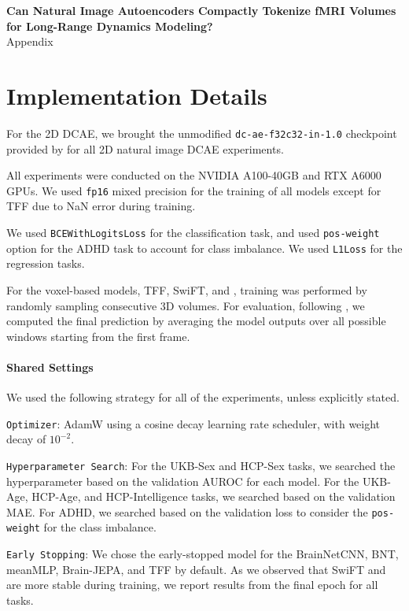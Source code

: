 \onecolumn
\clearpage
\renewcommand{\thetable}{A\arabic{table}}
\renewcommand\thesection{\Alph{section}}
\setcounter{section}{0}
{
\centering
\Large
\textbf{Can Natural Image Autoencoders Compactly Tokenize fMRI Volumes \\for Long-Range Dynamics Modeling?}\\
\vspace{0.5em}Appendix\\
\vspace{1.0em}
}

\section{Implementation Details}
\label{sec:experimental_details}
For the 2D DCAE, we brought the unmodified \texttt{dc-ae-f32c32-in-1.0} checkpoint provided by \citet{DCAE} for all 2D natural image DCAE experiments.

All experiments were conducted on the NVIDIA A100-40GB and RTX A6000 GPUs. We used \texttt{fp16} mixed precision for the training of all models except for TFF due to NaN error during training.

We used \texttt{BCEWithLogitsLoss} for the classification task, and used \texttt{pos-weight} option for the ADHD task to account for class imbalance.
We used \texttt{L1Loss} for the regression tasks.

For the voxel-based models, TFF, SwiFT, and {\ours}, training was performed by randomly sampling consecutive 3D volumes. For evaluation, following \citet{swift}, we computed the final prediction by averaging the model outputs over all possible windows starting from the first frame.

\paragraph{Shared Settings}
We used the following strategy for all of the experiments, unless explicitly stated.
\begin{compactitem}
\item \texttt{Optimizer}: AdamW using a cosine decay learning rate scheduler, with weight decay of $10^{-2}$.

\item \texttt{Hyperparameter Search}: For the UKB-Sex and HCP-Sex tasks, we searched the hyperparameter based on the validation AUROC for each model.
For the UKB-Age, HCP-Age, and HCP-Intelligence tasks, we searched based on the validation MAE.
For ADHD, we searched based on the validation loss to consider the \texttt{pos-weight} for the class imbalance.

\item \texttt{Early Stopping}: We chose the early-stopped model for the BrainNetCNN, BNT, meanMLP, Brain-JEPA, and TFF by default. As we observed that SwiFT and {\ours} are more stable during training, we report results from the final epoch for all tasks.


\end{compactitem}


